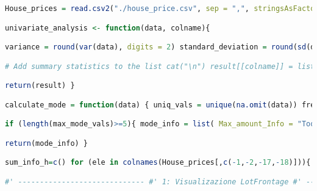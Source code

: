 \documentclass{article}
\begin{document}
\begin{center}
\begin{lstlisting}[language=R]
House_prices = read.csv2("./house_price.csv", sep = ",", stringsAsFactors=T, row.names=1) attach(House_prices) #' --------------------- #' Analisi Univariata #' ---------------------

univariate_analysis <- function(data, colname){

variance = round(var(data), digits = 2) standard_deviation = round(sd(data), digits = 2) result = list()

# Add summary statistics to the list cat("\n") result[[colname]] = list( #' Informazioni contenenti il minimo, il 1° e il 3° quartile, #' la media (2° quartile), la mediana (valore centrale), #' il massimo e la quantità di dati non validi. Summary = summary(data), #' Informazioni contenenti la varianza Variance = format(variance, scientific = FALSE), #' Informazioni contenenti la deviazione standard Standard_Deviation = format(standard_deviation, scientific = FALSE), #' Informazioni contenenti la moda Moda = calculate_mode(data) ) cat("\n")

return(result) }

calculate_mode = function(data) { uniq_vals = unique(na.omit(data)) freq_vals = tabulate(match(na.omit(data), uniq_vals)) max_mode_vals = uniq_vals[freq_vals == max(freq_vals)] min_mode_vals = uniq_vals[freq_vals == min(freq_vals)]

if (length(max_mode_vals)>=5){ mode_info = list( Max_amount_Info = "Too many max Values", Minimum_amount_Info = list(c(min_Value = min_mode_vals, freq = min(freq_vals))) ) } else if (length(min_mode_vals)>=5){ mode_info = list( Max_amount_Info = list(c(max_Value = max_mode_vals, freq = max(freq_vals))), Minimum_amount_Info = "Too many min Values" ) } else if (length(min_mode_vals)<5 & length(max_mode_vals)<5){ mode_info = list( Max_amount_Info = list(c(max_Value = max_mode_vals, freq = max(freq_vals))), Minimum_amount_Info = list(c(min_Value = min_mode_vals, freq = min(freq_vals))) ) } else{ mode_info = "Too many mins and maxs" }

return(mode_info) }

sum_info_h=c() for (ele in colnames(House_prices[,c(-1,-2,-17,-18)])){ colummn = na.omit(House_prices[,ele]) if (is.numeric(colummn)){ sum_info_h = c(sum_info_h, univariate_analysis(colummn,ele)) } }

#' ----------------------------- #' 1: Visualizazione LotFrontage #' -----------------------------


\end{lstlisting}
\end{center}
\end{document}
